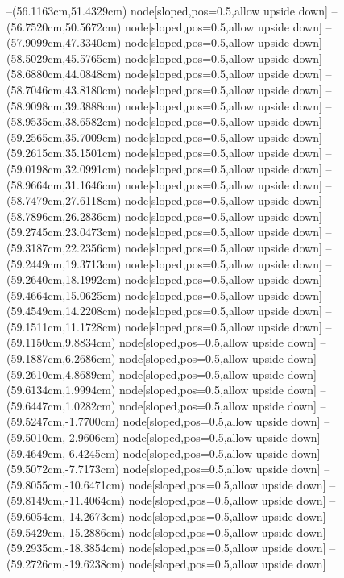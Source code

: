--(56.1163cm,51.4329cm) node[sloped,pos=0.5,allow upside down]{\ArrowIn}
--(56.7520cm,50.5672cm) node[sloped,pos=0.5,allow upside down]{\ArrowIn}
--(57.9099cm,47.3340cm) node[sloped,pos=0.5,allow upside down]{\ArrowIn}
--(58.5029cm,45.5765cm) node[sloped,pos=0.5,allow upside down]{\ArrowIn}
--(58.6880cm,44.0848cm) node[sloped,pos=0.5,allow upside down]{\ArrowIn}
--(58.7046cm,43.8180cm) node[sloped,pos=0.5,allow upside down]{\arrowIn}
--(58.9098cm,39.3888cm) node[sloped,pos=0.5,allow upside down]{\ArrowIn}
--(58.9535cm,38.6582cm) node[sloped,pos=0.5,allow upside down]{\arrowIn}
--(59.2565cm,35.7009cm) node[sloped,pos=0.5,allow upside down]{\ArrowIn}
--(59.2615cm,35.1501cm) node[sloped,pos=0.5,allow upside down]{\arrowIn}
--(59.0198cm,32.0991cm) node[sloped,pos=0.5,allow upside down]{\ArrowIn}
--(58.9664cm,31.1646cm) node[sloped,pos=0.5,allow upside down]{\arrowIn}
--(58.7479cm,27.6118cm) node[sloped,pos=0.5,allow upside down]{\ArrowIn}
--(58.7896cm,26.2836cm) node[sloped,pos=0.5,allow upside down]{\ArrowIn}
--(59.2745cm,23.0473cm) node[sloped,pos=0.5,allow upside down]{\ArrowIn}
--(59.3187cm,22.2356cm) node[sloped,pos=0.5,allow upside down]{\arrowIn}
--(59.2449cm,19.3713cm) node[sloped,pos=0.5,allow upside down]{\ArrowIn}
--(59.2640cm,18.1992cm) node[sloped,pos=0.5,allow upside down]{\ArrowIn}
--(59.4664cm,15.0625cm) node[sloped,pos=0.5,allow upside down]{\ArrowIn}
--(59.4549cm,14.2208cm) node[sloped,pos=0.5,allow upside down]{\arrowIn}
--(59.1511cm,11.1728cm) node[sloped,pos=0.5,allow upside down]{\ArrowIn}
--(59.1150cm,9.8834cm) node[sloped,pos=0.5,allow upside down]{\ArrowIn}
--(59.1887cm,6.2686cm) node[sloped,pos=0.5,allow upside down]{\ArrowIn}
--(59.2610cm,4.8689cm) node[sloped,pos=0.5,allow upside down]{\ArrowIn}
--(59.6134cm,1.9994cm) node[sloped,pos=0.5,allow upside down]{\ArrowIn}
--(59.6447cm,1.0282cm) node[sloped,pos=0.5,allow upside down]{\arrowIn}
--(59.5247cm,-1.7700cm) node[sloped,pos=0.5,allow upside down]{\ArrowIn}
--(59.5010cm,-2.9606cm) node[sloped,pos=0.5,allow upside down]{\ArrowIn}
--(59.4649cm,-6.4245cm) node[sloped,pos=0.5,allow upside down]{\ArrowIn}
--(59.5072cm,-7.7173cm) node[sloped,pos=0.5,allow upside down]{\ArrowIn}
--(59.8055cm,-10.6471cm) node[sloped,pos=0.5,allow upside down]{\ArrowIn}
--(59.8149cm,-11.4064cm) node[sloped,pos=0.5,allow upside down]{\arrowIn}
--(59.6054cm,-14.2673cm) node[sloped,pos=0.5,allow upside down]{\ArrowIn}
--(59.5429cm,-15.2886cm) node[sloped,pos=0.5,allow upside down]{\ArrowIn}
--(59.2935cm,-18.3854cm) node[sloped,pos=0.5,allow upside down]{\ArrowIn}
--(59.2726cm,-19.6238cm) node[sloped,pos=0.5,allow upside down]{\ArrowIn}
